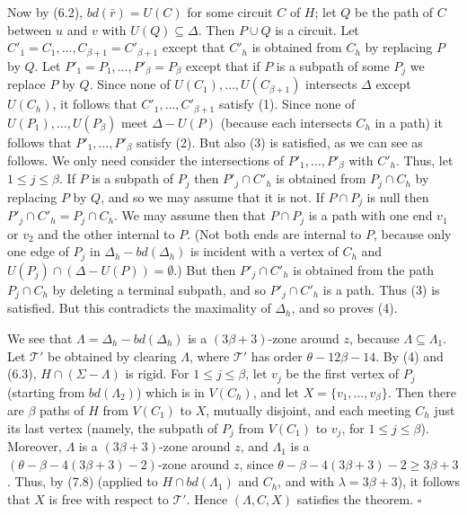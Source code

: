 Now by (6.2), $bd(\bar{r}) = U(C)$ for some circuit $C$ of $H$; let $Q$ be the path of $C$ between $u$ and $v$ with $U(Q) \subseteq \Delta$. Then $P \cup Q$ is a circuit. Let $C'_1 = C_1, \dots, C_{\beta+1} = C'_{\beta+1}$ except that $C'_h$ is obtained from $C_h$ by replacing $P$ by $Q$. Let $P'_1 = P_1, \dots, P'_\beta = P_\beta$ except that if $P$ is a subpath of some $P_j$ we replace $P$ by $Q$. Since none of $U(C_1), \dots, U(C_{\beta+1})$ intersects $\Delta$ except $U(C_h)$, it follows that $C'_1, \dots, C'_{\beta+1}$ satisfy (1). Since none of $U(P_1), \dots, U(P_\beta)$ meet $\Delta - U(P)$ (because each intersects $C_h$ in a path) it follows that $P'_1, \dots, P'_\beta$ satisfy (2). But also (3) is satisfied, as we can see as follows. We only need consider the intersections of $P'_1, \dots, P'_\beta$ with $C'_h$. Thus, let $1 \le j \le \beta$. If $P$ is a subpath of $P_j$ then $P'_j \cap C'_h$ is obtained from $P_j \cap C_h$ by replacing $P$ by $Q$, and so we may assume that it is not. If $P \cap P_j$ is null then $P'_j \cap C'_h = P_j \cap C_h$. We may assume then that $P \cap P_j$ is a path with one end $v_1$ or $v_2$ and the other internal to $P$. (Not both ends are internal to $P$, because only one edge of $P_j$ in $\Delta_h - bd(\Delta_h)$ is incident with a vertex of $C_h$ and $U(P_j) \cap (\Delta - U(P)) = \emptyset$.) But then $P'_j \cap C'_h$ is obtained from the path $P_j \cap C_h$ by deleting a terminal subpath, and so $P'_j \cap C'_h$ is a path. Thus (3) is satisfied. But this contradicts the maximality of $\Delta_h$, and so proves (4).

We see that $\Lambda = \Delta_h - bd(\Delta_h)$ is a $(3\beta + 3)$-zone around $z$, because $\Lambda \subseteq \Lambda_1$. Let $\mathscr{T}'$ be obtained by clearing $\Lambda$, where $\mathscr{T}'$ has order $\theta - 12\beta - 14$. By (4) and (6.3), $H \cap (\Sigma - \Lambda)$ is rigid. For $1 \le j \le \beta$, let $v_j$ be the first vertex of $P_j$ (starting from $bd(\Lambda_2)$) which is in $V(C_h)$, and let $X = \{v_1, \dots, v_\beta\}$. Then there are $\beta$ paths of $H$ from $V(C_1)$ to $X$, mutually disjoint, and each meeting $C_h$ just its last vertex (namely, the subpath of $P_j$ from $V(C_1)$ to $v_j$, for $1 \le j \le \beta$). Moreover, $\Lambda$ is a $(3\beta + 3)$-zone around $z$, and $\Lambda_1$ is a $(\theta - \beta - 4(3\beta + 3) - 2)$-zone around $z$, since $\theta - \beta - 4(3\beta + 3) - 2 \ge 3\beta + 3$. Thus, by (7.8) (applied to $H \cap bd(\Lambda_1)$ and $C_h$, and with $\lambda = 3\beta + 3$), it follows that $X$ is free with respect to $\mathscr{T}'$. Hence $(\Lambda, C, X)$ satisfies the theorem. $\square$

